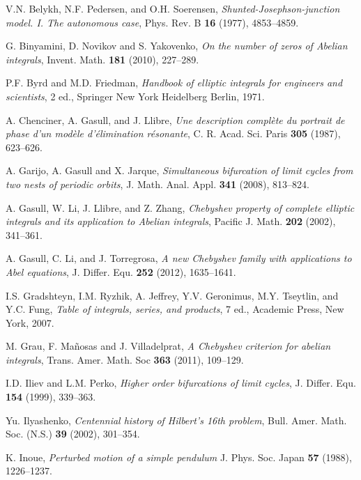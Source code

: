 \documentclass[12pt,psamsfonts]{amsart}
\begin{document}
\begin{thebibliography}{10}

V.N. Belykh, N.F. Pedersen, and O.H. Soerensen,
  \emph{{Shunted-Josephson-junction model. I. The autonomous case}}, Phys. Rev.
  B \textbf{16} (1977), 4853--4859.

  G. Binyamini, D.  Novikov and S. Yakovenko,
\emph{On the number of zeros of Abelian integrals}, Invent. Math. \textbf{181} (2010),  227--289.

P.F. Byrd and M.D. Friedman, \emph{{Handbook of elliptic integrals for
  engineers and scientists}}, 2 ed., Springer New York Heidelberg Berlin, 1971.

A. Chenciner, A. Gasull, and J. Llibre, \emph{{Une description
  compl\`{e}te du portrait de phase d'un mod\`{e}le d'\'{e}limination
  r\'{e}sonante}}, C. R. Acad. Sci. Paris \textbf{305} (1987), 623--626.

    A. Garijo, A. Gasull and X.  Jarque, \emph{Simultaneous bifurcation
  of limit cycles from two nests of periodic orbits}, J. Math. Anal. Appl. \textbf{341} (2008),
   813--824.

A. Gasull, W. Li, J. Llibre, and Z. Zhang, \emph{{Chebyshev
  property of complete elliptic integrals and its application to Abelian
  integrals}}, Pacific J. Math. \textbf{202} (2002), 341--361.

A. Gasull, C. Li, and J. Torregrosa, \emph{{A new Chebyshev
  family with applications to Abel equations}}, J. Differ. Equ. \textbf{252}
  (2012),  1635--1641.

I.S. Gradshteyn, I.M. Ryzhik, A. Jeffrey, Y.V. Geronimus, M.Y. Tseytlin,
  and Y.C. Fung, \emph{{Table of integrals, series, and products}}, 7 ed.,
  Academic Press, New York, 2007.

M. Grau, F. Ma\~{n}osas and J. Villadelprat, \emph{{A Chebyshev
  criterion for abelian integrals}}, Trans. Amer. Math. Soc \textbf{363}
  (2011),  109--129.

I.D. Iliev and L.M. Perko, \emph{{Higher order bifurcations of limit
  cycles}}, J. Differ. Equ. \textbf{154} (1999), 339--363.

  Yu. Ilyashenko,
\emph{Centennial history of Hilbert's 16th problem}, Bull. Amer. Math. Soc. (N.S.) \textbf{39}
(2002),  301--354.

  K. Inoue, \emph{Perturbed
motion of a simple pendulum} J. Phys. Soc. Japan \textbf{57} (1988),  1226--1237.


\end{thebibliography}
\end{document}

